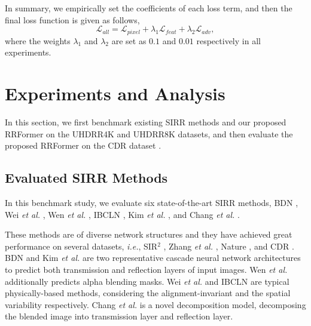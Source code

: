 \documentclass[10pt,journal]{IEEEtran}
\begin{document}
In summary, we empirically set the coefficients of each loss term, and then the final loss function is given as follows, 
\begin{equation}
	\mathcal{L}_{all} = \mathcal{L}_{pixel} + \lambda_{1}\mathcal{L}_{feat} + \lambda_{2}\mathcal{L}_{adv},  \label{eq11}
\end{equation}
where the weights $\lambda_{1}$ and $\lambda_{2}$ are set as $0.1$ and $0.01$ respectively in all experiments. 


\section{Experiments and Analysis}
In this section, we first benchmark existing SIRR methods and our proposed RRFormer on the UHDRR4K and UHDRR8K datasets, and then evaluate the proposed RRFormer on the CDR dataset \cite{leiCategorizedReflectionRemoval2022}. 

\subsection{Evaluated SIRR Methods}\label{Evaluated_Methods}
In this benchmark study, we evaluate six state-of-the-art SIRR methods, BDN \cite{yangSeeingDeeplyBidirectionally2018}, Wei \textit{et al.} \cite{weiSingleImageReflection2019}, Wen \textit{et al.} \cite{wenSingleImageReflection2019}, IBCLN \cite{liSingleImageReflection2020}, Kim \textit{et al.} \cite{kimSingleImageReflection2020}, and Chang \textit{et al.} \cite{changSingleImageReflection2021}.

These methods are of diverse network structures and they have achieved great performance on several datasets, \textit{i.e.}, SIR$^2$ \cite{wanBenchmarkingSingleimageReflection2017}, Zhang \textit{et al.} \cite{zhangSingleImageReflection2018}, Nature \cite{liSingleImageReflection2020}, and CDR \cite{leiCategorizedReflectionRemoval2022}.  BDN \cite{yangSeeingDeeplyBidirectionally2018} and Kim \textit{et al.} \cite{kimSingleImageReflection2020} are two representative cascade neural network architectures to predict both transmission and reflection layers of input images. 
Wen \textit{et al.} \cite{wenSingleImageReflection2019} additionally predicts alpha blending masks. 
Wei \textit{et al.} \cite{weiSingleImageReflection2019} and IBCLN \cite{liSingleImageReflection2020} are typical physically-based methods, considering the alignment-invariant and the spatial variability respectively. 
Chang \textit{et al.} \cite{changSingleImageReflection2021} is a novel decomposition model, decomposing the blended image into transmission layer and reflection layer. 
\end{document}
